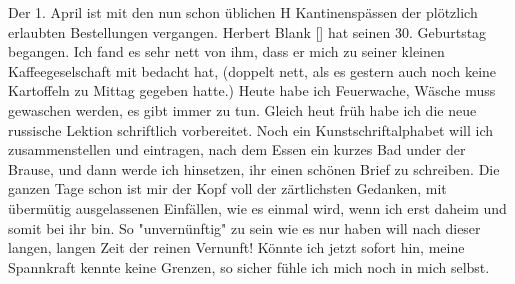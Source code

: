 \def\day{2. April 1943}
\mktitle

Der 1. April ist mit den nun schon \"{u}blichen H Kantinensp\"{a}ssen der pl\"{o}tzlich erlaubten Bestellungen vergangen.
Herbert Blank {\color{red} [] } hat seinen 30. Geburtstag begangen.
Ich fand es sehr nett von ihm, dass er mich zu seiner kleinen Kaffeegeselschaft mit bedacht hat, (doppelt nett, als es gestern auch noch keine Kartoffeln zu Mittag gegeben hatte.)
Heute habe ich Feuerwache, W\"{a}sche muss gewaschen werden, es gibt immer zu tun.
Gleich heut fr\"{u}h habe ich die neue russische Lektion schriftlich vorbereitet.
Noch ein Kunstschriftalphabet will ich zusammenstellen und eintragen, nach dem Essen ein kurzes Bad under der Brause, und dann werde ich hinsetzen, ihr einen sch\"{o}nen Brief zu schreiben.
Die ganzen Tage schon ist mir der Kopf voll der z\"{a}rtlichsten Gedanken, mit \"{u}berm\"{u}tig ausgelassenen Einf\"{a}llen, wie es einmal wird, wenn ich erst daheim und somit bei ihr bin.
So "unvern\"{u}nftig" zu sein wie es nur haben will nach dieser langen, langen Zeit der reinen Vernunft!
K\"{o}nnte ich jetzt sofort hin, meine Spannkraft kennte keine Grenzen, so sicher f\"{u}hle ich mich noch in mich selbst.

\clearpage
